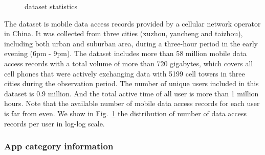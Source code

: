 \begin{figure}[ht]
  \centering
  \caption{dataset statistics}
	\label{fig:data_stat}
\end{figure}

The dataset is mobile data access records provided by a cellular network operator in China. It was collected from three cities (xuzhou, yancheng and taizhou), including both urban and suburban area, during a three-hour period in the early evening (6pm - 9pm). The dataset includes more than 58 million mobile data access records with a total volume of more than 720 gigabytes, which covers all cell phones that were actively exchanging data with 5199 cell towers in three cities during the observation period. The number of unique users included in this dataset is 0.9 million. And the total active time of all user is more than 1 million hours. Note that the available number of mobile data access records for each user is far from even. We show in Fig.~\ref{fig:data_stat} the distribution of number of data access records per user in log-log scale.

\subsubsection{App category information}

